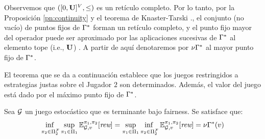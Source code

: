 Observemos que $([0,\mathbf{U}]^V, \leq)$ es un retículo completo. Por lo tanto, por la Proposición \ref{pn:continuity} y el teorema de Knaster-Tarski \cite{davey1990introduction}., el conjunto (no vacío) de puntos fijos de $\Gamma^*$ forman un retículo completo, y el punto fijo mayor del operador puede ser aproximado por las aplicaciones sucesivas de $\Gamma^*$ al elemento tope (i.e., $\mathbf{U}$) \cite{davey1990introduction}. A partir de aquí denotaremos por $\nu \Gamma^*$ al mayor punto fijo de $\Gamma^*$.

El teorema que se da a continuación establece que los juegos restringidos a estrategias justas sobre el Jugador $2$ son determinados.
Además, el valor del juego está dado por el máximo punto fijo de $\Gamma^*$.
\begin{theorem}\label{th:game-determinacy} Sea $\mathcal{G}$ un juego estocástico que es terminante bajo fairness. Se satisface que:
\[\adjustlimits
	\inf_{\strat{2} \in \FairStrats{2}} \sup_{\strat{1} \in \Strategies{1}} \Expect{\strat{1}}{\strat{2}}_{\StochG,v}[\Rewards] = \adjustlimits \sup_{\strat{1} \in \Strategies{1}}   \inf_{\strat{2} \in \FairStrats{2}}  \Expect{\strat{1}}{\strat{2}}_{\StochG,v}[\Rewards] = \nu \Bellman(v)
\]
\end{theorem}
%
